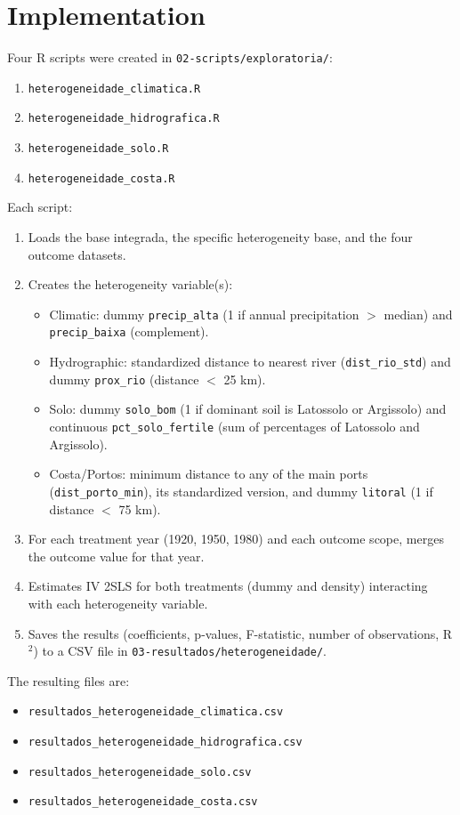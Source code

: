 \documentclass{article}
\begin{document}
\section{Implementation}
Four R scripts were created in \texttt{02-scripts/exploratoria/}:
\begin{enumerate}
\item \texttt{heterogeneidade\_climatica.R}
\item \texttt{heterogeneidade\_hidrografica.R}
\item \texttt{heterogeneidade\_solo.R}
\item \texttt{heterogeneidade\_costa.R}
\end{enumerate}
Each script:
\begin{enumerate}
\item Loads the base integrada, the specific heterogeneity base, and the four outcome datasets.
\item Creates the heterogeneity variable(s):
  \begin{itemize}
  \item Climatic: dummy \texttt{precip\_alta} (1 if annual precipitation $>$ median) and \texttt{precip\_baixa} (complement).
  \item Hydrographic: standardized distance to nearest river (\texttt{dist\_rio\_std}) and dummy \texttt{prox\_rio} (distance $<$ 25 km).
  \item Solo: dummy \texttt{solo\_bom} (1 if dominant soil is Latossolo or Argissolo) and continuous \texttt{pct\_solo\_fertile} (sum of percentages of Latossolo and Argissolo).
  \item Costa/Portos: minimum distance to any of the main ports (\texttt{dist\_porto\_min}), its standardized version, and dummy \texttt{litoral} (1 if distance $<$ 75 km).
  \end{itemize}
\item For each treatment year (1920, 1950, 1980) and each outcome scope, merges the outcome value for that year.
\item Estimates IV 2SLS for both treatments (dummy and density) interacting with each heterogeneity variable.
\item Saves the results (coefficients, p-values, F-statistic, number of observations, R$^2$) to a CSV file in \texttt{03-resultados/heterogeneidade/}.
\end{enumerate}
The resulting files are:
\begin{itemize}
\item \texttt{resultados\_heterogeneidade\_climatica.csv}
\item \texttt{resultados\_heterogeneidade\_hidrografica.csv}
\item \texttt{resultados\_heterogeneidade\_solo.csv}
\item \texttt{resultados\_heterogeneidade\_costa.csv}
\end{itemize}
\end{document}
